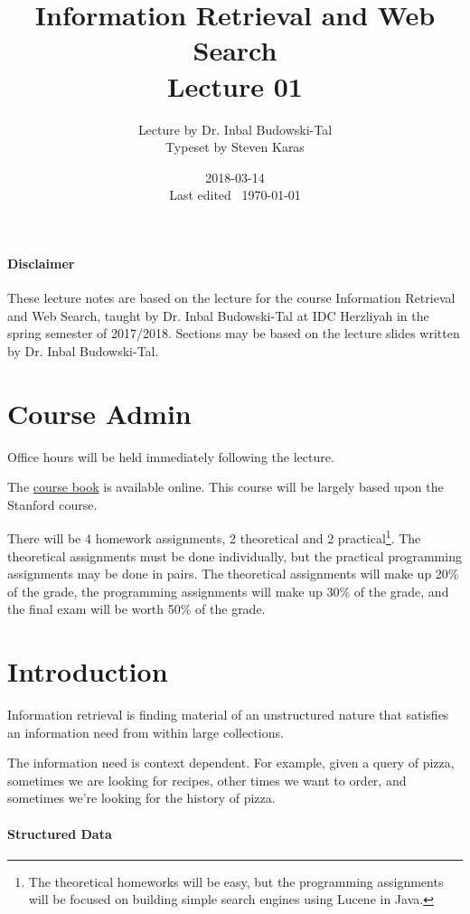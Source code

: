 \documentclass{idc_msc}
\title{Information Retrieval and Web Search\\\large Lecture 01}
\date{2018-03-14 \\ Last edited \currenttime\ \today}
\author{Lecture by Dr. Inbal Budowski-Tal\\Typeset by Steven Karas}
\begin{document}
\maketitle

\paragraph{Disclaimer}

These lecture notes are based on the lecture for the course Information Retrieval and Web Search, taught by Dr. Inbal Budowski-Tal at IDC Herzliyah in the spring semester of 2017/2018.
Sections may be based on the lecture slides written by Dr. Inbal Budowski-Tal.

\section{Course Admin}

Office hours will be held immediately following the lecture.

The \href{https://nlp.stanford.edu/IR-book/}{course book} is available online.
This course will be largely based upon the Stanford course.

There will be 4 homework assignments, 2 theoretical and 2 practical\footnote{The theoretical homeworks will be easy, but the programming assignments will be focused on building simple search engines using Lucene in Java.}.
The theoretical assignments must be done individually, but the practical programming assignments may be done in pairs.
The theoretical assignments will make up 20\% of the grade, the programming assignments will make up 30\% of the grade, and the final exam will be worth 50\% of the grade.

\section{Introduction}

Information retrieval is finding material of an unstructured nature that satisfies an information need from within large collections.

The information need is context dependent. For example, given a query of pizza, sometimes we are looking for recipes, other times we want to order, and sometimes we're looking for the history of pizza.

\paragraph{Structured Data}
\end{document}
